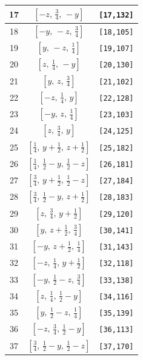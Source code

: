 \documentclass[fleqn,8pt]{jsarticle}
\begin{document}
\begin{longtable}{ccc}
17 & $\left[ - z,\, \frac{3}{4},\, - y \right]$ & {\tt [17,132]} \\ \hline
18 & $\left[ - y,\, - z,\, \frac{3}{4} \right]$ & {\tt [18,105]} \\ \hline
19 & $\left[ y,\, - z,\, \frac{1}{4} \right]$ & {\tt [19,107]} \\ \hline
20 & $\left[ z,\, \frac{1}{4},\, - y \right]$ & {\tt [20,130]} \\ \hline
21 & $\left[ y,\, z,\, \frac{3}{4} \right]$ & {\tt [21,102]} \\ \hline
22 & $\left[ - z,\, \frac{1}{4},\, y \right]$ & {\tt [22,128]} \\ \hline
23 & $\left[ - y,\, z,\, \frac{1}{4} \right]$ & {\tt [23,103]} \\ \hline
24 & $\left[ z,\, \frac{3}{4},\, y \right]$ & {\tt [24,125]} \\ \hline
25 & $\left[ \frac{1}{4},\, y + \frac{1}{2},\, z + \frac{1}{2} \right]$ & {\tt [25,182]} \\ \hline
26 & $\left[ \frac{1}{4},\, \frac{1}{2} - y,\, \frac{1}{2} - z \right]$ & {\tt [26,181]} \\ \hline
27 & $\left[ \frac{3}{4},\, y + \frac{1}{2},\, \frac{1}{2} - z \right]$ & {\tt [27,184]} \\ \hline
28 & $\left[ \frac{3}{4},\, \frac{1}{2} - y,\, z + \frac{1}{2} \right]$ & {\tt [28,183]} \\ \hline
29 & $\left[ z,\, \frac{3}{4},\, y + \frac{1}{2} \right]$ & {\tt [29,120]} \\ \hline
30 & $\left[ y,\, z + \frac{1}{2},\, \frac{3}{4} \right]$ & {\tt [30,141]} \\ \hline
31 & $\left[ - y,\, z + \frac{1}{2},\, \frac{1}{4} \right]$ & {\tt [31,143]} \\ \hline
32 & $\left[ - z,\, \frac{1}{4},\, y + \frac{1}{2} \right]$ & {\tt [32,118]} \\ \hline
33 & $\left[ - y,\, \frac{1}{2} - z,\, \frac{3}{4} \right]$ & {\tt [33,138]} \\ \hline
34 & $\left[ z,\, \frac{1}{4},\, \frac{1}{2} - y \right]$ & {\tt [34,116]} \\ \hline
35 & $\left[ y,\, \frac{1}{2} - z,\, \frac{1}{4} \right]$ & {\tt [35,139]} \\ \hline
36 & $\left[ - z,\, \frac{3}{4},\, \frac{1}{2} - y \right]$ & {\tt [36,113]} \\ \hline
37 & $\left[ \frac{3}{4},\, \frac{1}{2} - y,\, \frac{1}{2} - z \right]$ & {\tt [37,170]} \\ \hline

\end{longtable}
\end{document}
